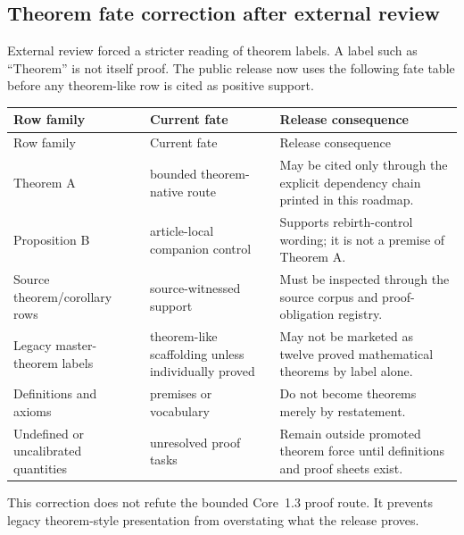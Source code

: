 \clearpage


\subsection{Theorem fate correction after external review}
\label{sec:oc13-theorem-fate-correction-v3}

External review forced a stricter reading of theorem labels. A label such as
``Theorem'' is not itself proof. The public release now uses the following fate
table before any theorem-like row is cited as positive support.

\begin{longtable}{@{}p{}p{}p{}@{}}
\toprule
Row family & Current fate & Release consequence \\
\midrule
\endfirsthead
\toprule
Row family & Current fate & Release consequence \\
\midrule
\endhead
Theorem A & bounded theorem-native route & May be cited only through the explicit dependency chain printed in this roadmap. \\
Proposition B & article-local companion control & Supports rebirth-control wording; it is not a premise of Theorem A. \\
Source theorem/corollary rows & source-witnessed support & Must be inspected through the source corpus and proof-obligation registry. \\
Legacy master-theorem labels & theorem-like scaffolding unless individually proved & May not be marketed as twelve proved mathematical theorems by label alone. \\
Definitions and axioms & premises or vocabulary & Do not become theorems merely by restatement. \\
Undefined or uncalibrated quantities & unresolved proof tasks & Remain outside promoted theorem force until definitions and proof sheets exist. \\
\bottomrule
\end{longtable}

This correction does not refute the bounded Core~1.3 proof route. It prevents
legacy theorem-style presentation from overstating what the release proves.
